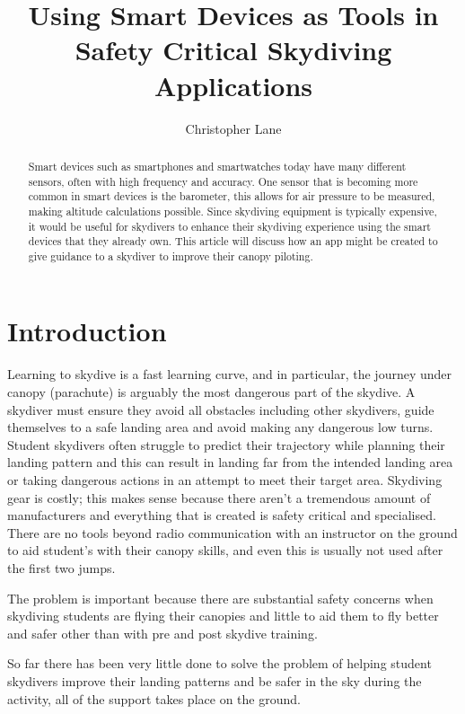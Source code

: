 \documentclass[11pt, a4paper, twocolumn]{article}
\title{Using Smart Devices as Tools in Safety Critical Skydiving Applications}
\author{Christopher Lane}
\begin{document}
\maketitle

\begin{abstract} %
    Smart devices such as smartphones and smartwatches today have many different sensors, often with high frequency and accuracy. One sensor that is becoming more common in smart devices is the barometer, this allows for air pressure to be measured, making altitude calculations possible. Since skydiving equipment is typically expensive, it would be useful for skydivers to enhance their skydiving experience using the smart devices that they already own. This article will discuss how an app might be created to give guidance to a skydiver to improve their canopy piloting.
\end{abstract}

\section{Introduction}\label{sec:introduction} %

Learning to skydive is a fast learning curve, and in particular, the journey under canopy (parachute) is arguably the most dangerous part of the skydive. A skydiver must ensure they avoid all obstacles including other skydivers, guide themselves to a safe landing area and avoid making any dangerous low turns. Student skydivers often struggle to predict their trajectory while planning their landing pattern and this can result in landing far from the intended landing area or taking dangerous actions in an attempt to meet their target area.
Skydiving gear is costly; this makes sense because there aren't a tremendous amount of manufacturers and everything that is created is safety critical and specialised. There are no tools beyond radio communication with an instructor on the ground to aid student's with their canopy skills, and even this is usually not used after the first two jumps.

The problem is important because there are substantial safety concerns when skydiving students are flying their canopies and little to aid them to fly better and safer other than with pre and post skydive training.

So far there has been very little done to solve the problem of helping student skydivers improve their landing patterns and be safer in the sky during the activity, all of the support takes place on the ground.
\end{document}
